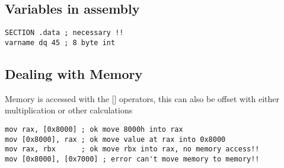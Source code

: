 \documentclass[main.tex,fontsize=7pt,paper=a4,paper=landscape,DIV=calc,]{scrartcl}
\begin{document}
\begin{multicols*}{4}
\subsection{Variables in assembly}
\vspace{-2.5mm}
\begin{lstlisting}
SECTION .data ; necessary !!
varname dq 45 ; 8 byte int
\end{lstlisting}
\vspace{2mm}

\subsection{Dealing with Memory}
Memory is accessed with the [] operators, this can also be offset with either multiplication or other calculations
\vspace{-2.5mm}
\begin{lstlisting}
mov rax, [0x8000] ; ok move 8000h into rax
mov [0x8000], rax ; ok move value at rax into 0x8000
mov rax, rbx      ; ok move rbx into rax, no memory access!!
mov [0x8000], [0x7000] ; error can't move memory to memory!!
\end{lstlisting}
\vspace{2mm}


\end{multicols*}
\end{document}
